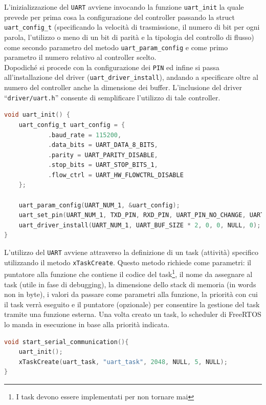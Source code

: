 \noindent L'inizializzazione del \texttt{UART} avviene invocando la funzione \texttt{uart\_init} la quale prevede per prima cosa la configurazione del controller passando la struct \texttt{uart\_config\_t} (specificando la velocità di trasmissione, il numero di bit per ogni parola, l'utilizzo o meno di un bit di parità e la tipologia del controllo di flusso) come secondo parametro del metodo \texttt{uart\_param\_config} e come primo parametro il numero relativo al controller scelto. \\
Dopodiché si procede con la configurazione dei \texttt{PIN} ed infine si passa all'installazione del driver (\texttt{uart\_driver\_install}), andando a specificare oltre al numero del controller anche la dimensione dei buffer. L'inclusione del driver ``\texttt{driver/uart.h}'' consente di semplificare l'utilizzo di tale controller.\\

\begin{lstlisting}[language=C, caption= Configurazione e installazione driver \texttt{UART}]
void uart_init() {
    uart_config_t uart_config = {
            .baud_rate = 115200,
            .data_bits = UART_DATA_8_BITS,
            .parity = UART_PARITY_DISABLE,
            .stop_bits = UART_STOP_BITS_1,
            .flow_ctrl = UART_HW_FLOWCTRL_DISABLE
    };

    uart_param_config(UART_NUM_1, &uart_config);
    uart_set_pin(UART_NUM_1, TXD_PIN, RXD_PIN, UART_PIN_NO_CHANGE, UART_PIN_NO_CHANGE);
    uart_driver_install(UART_NUM_1, UART_BUF_SIZE * 2, 0, 0, NULL, 0);
}
\end{lstlisting}

\noindent L'utilizzo del \texttt{UART} avviene attraverso la definizione di un task (attività) specifico utilizzando il metodo \texttt{xTaskCreate}. Questo metodo richiede come parametri: il puntatore alla funzione che contiene il codice del task\footnote{I task devono essere implementati per non tornare mai}, il nome da assegnare al task (utile in fase di debugging), la dimensione dello stack di memoria (in words non in byte), i valori da passare come parametri alla funzione, la priorità con cui il task verrà eseguito e il puntatore (opzionale) per consentire la gestione del task tramite una funzione esterna. Una volta creato un task, lo scheduler di FreeRTOS lo manda in esecuzione in base alla priorità indicata.\\

\begin{lstlisting}[language=C, caption= Inizializzazione e definizione del task per utilizzare il \texttt{UART}]
void start_serial_communication(){
    uart_init();
    xTaskCreate(uart_task, "uart_task", 2048, NULL, 5, NULL);
}
\end{lstlisting}

